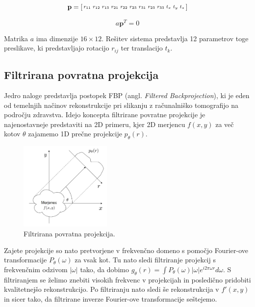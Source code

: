 \documentclass[journal,a4paper,twoside]{sty/IEEEtran}
\begin{document}
\begin{equation}
\setcounter{MaxMatrixCols}{12}
\textbf{p} =
\begin{bsmallmatrix}
r_{11} & r_{12} & r_{13} & r_{21} & r_{22} & r_{23} & r_{31} & r_{23} & r_{33} & t_x & t_y & t_z
\end{bsmallmatrix}
\end{equation}

\begin{equation}
a\textbf{p}^T=0
\end{equation}

Matrika $a$ ima dimenzije $16 \times 12$. Rešitev sistema predstavlja 12 parametrov toge preslikave, ki predstavljajo rotacijo $r_{ij}$ ter translacijo $t_k$.

\subsection{Filtrirana povratna projekcija}

Jedro naloge predstavlja postopek FBP (angl. \textit{Filtered Backprojection}), ki je eden od temelnjih načinov rekonstrukcije pri slikanju z računalniško tomografijo na področju zdravstva. Idejo koncepta filtrirane povratne projekcije je najenostavneje predstaviti na 2D primeru, kjer 2D merjencu $f(x,y)$ za več kotov $\theta$ zajamemo 1D prečne projekcije $p_{\theta}(r)$.

\begin{figure}[H]
	\centerline{\includegraphics[width=4.5cm]{fig/FBPderi}}
	\caption{Filtrirana povratna projekcija.}
	\label{fig:fbp_deri}
\end{figure}

Zajete projekcije so nato pretvorjene v frekvenčno domeno s pomočjo Fourier-ove transformacije $P_{\theta}(\omega)$ za vsak kot. Tu nato sledi filtriranje projekcij s frekvenčnim odzivom $|\omega|$ tako, da dobimo $g_{\theta}(r) = \int  P_{\theta}(\omega)|\omega|e^{i 2\pi\omega r} d\omega$. S filtriranjem se želimo znebiti visokih frekvenc v projekcijah in posledično pridobiti kvalitetnejšo rekonstrukcijo. Po filtriranju nato sledi še rekonstrukcija v $f'(x,y)$ in sicer tako, da filtrirane inverze Fourier-ove transformacije seštejemo.
\end{document}
